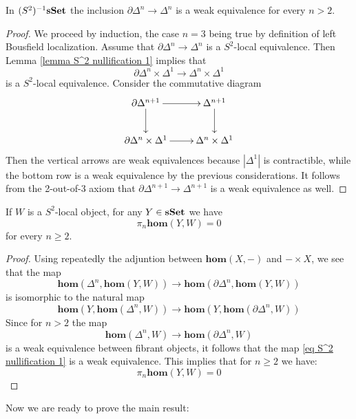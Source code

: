 \begin{lemma} \label{lemma S^2 nullification 2}
In $(S^2)^{-1} \mathbf{sSet}$ the inclusion $\partial \Delta^n \to \Delta^n$ is a weak equivalence for every $n > 2$.
\end{lemma}

\begin{proof}
We proceed by induction, the case $n = 3$ being true by definition of left Bousfield localization. Assume that $\partial \Delta^n \to \Delta^n$ is a $S^2$-local equivalence. Then Lemma \ref{lemma S^2 nullification 1} implies that
\[
\partial \Delta^n \times \Delta^1 \to \Delta^n \times \Delta^1
\]
is a $S^2$-local equivalence. Consider the commutative diagram
\[
\xymatrix{
\partial \Delta^{n+1} \ar[r] \ar[d] & \Delta^{n+1} \ar[d] \\ \partial \Delta^n \times \Delta^1 \ar[r] & \Delta^n \times \Delta^1
}
\]
Then the vertical arrows are weak equivalences because $|\Delta^1|$ is contractible, while the bottom row is a weak equivalence by the previous considerations. It follows from the 2-out-of-3 axiom that $\partial \Delta^{n+1} \to \Delta^{n+1}$ is a weak equivalence as well.
\end{proof}

\begin{cor} \label{cor S^2 nullification}
If $W$ is a $S^2$-local object, for any $Y \in \mathbf{sSet}$ we have
\[
\pi_n \mathbf{hom}(Y,W) = 0
\]
for every $n \ge 2$.
\end{cor}

\begin{proof}
Using repeatedly the adjuntion between $\mathbf{hom}(X,-)$ and $- \times X$, we see that the map
\begin{equation} \label{eq S^2 nullification 1}
\mathbf{hom}(\Delta^n, \mathbf{hom}(Y,W)) \to \mathbf{hom}(\partial \Delta^n, \mathbf{hom}(Y,W))
\end{equation}
is isomorphic to the natural map
\[
\mathbf{hom}(Y, \mathbf{hom}(\Delta^n,W)) \to \mathbf{hom}(Y, \mathbf{hom}(\partial \Delta^n,W))
\]
Since for $n > 2$ the map
\[
\mathbf{hom}(\Delta^n,W) \to \mathbf{hom}(\partial \Delta^n,W)
\]
is a weak equivalence between fibrant objects, it follows that the map \eqref{eq S^2 nullification 1} is a weak equivalence. This implies that for $n \ge 2$ we have:
\[
\pi_n \mathbf{hom}(Y,W) = 0
\]
\end{proof}

Now we are ready to prove the main result:

